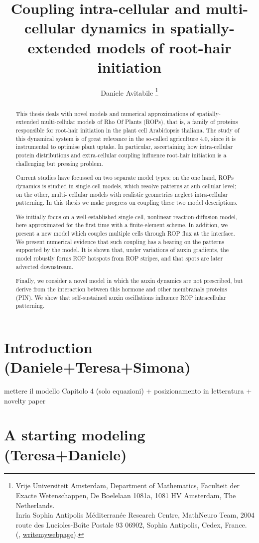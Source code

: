 \documentclass[a4paper]{siamart190516}
\title{Coupling intra-cellular and multi-cellular dynamics in spatially-extended models of root-hair initiation}
\author{%
  Daniele Avitabile%
  \thanks{%
    Vrije Universiteit Amsterdam,
    Department of Mathematics,
    Faculteit der Exacte Wetenschappen,
    De Boelelaan 1081a,
    1081 HV Amsterdam, The Netherlands.
  \protect\\
    Inria Sophia Antipolis M\'editerran\'ee Research Centre,
    MathNeuro Team,
    2004 route des Lucioles-Boîte Postale 93 06902,
    Sophia Antipolis, Cedex, France.
  \protect\\
    (\email{d.avitabile@vu.nl}, \url{writemywebpage}).
  }
}
\begin{document}
\maketitle

\begin{abstract}
This thesis deals with novel models and numerical approximations of spatially-extended multi-cellular models of Rho Of Plants (ROPs), that is, a family of proteins responsible for root-hair initiation in the plant cell Arabidopsis thaliana. The study of this dynamical system is of great relevance in the so-called agriculture 4.0, since it is instrumental to optimise plant uptake. In particular, ascertaining how intra-cellular protein distributions and extra-cellular coupling influence root-hair initiation is a challenging but pressing problem.

Current studies have focussed on two separate model types: on the one hand, ROPs dynamics is studied in single-cell models, which resolve patterns at sub cellular level; on the other, multi- cellular models with realistic geometries neglect intra-cellular patterning. In this thesis we make progress on coupling these two
model descriptions.

We initially focus on a well-established single-cell, nonlinear reaction-diffusion model, here approximated for the first time with a finite-element scheme. In addition, we present a new model which couples multiple cells through ROP flux at the interface. We present numerical evidence that such coupling has a bearing on the patterns supported by the model. It is shown that, under variations of auxin gradients, the model robustly forms ROP hotspots from ROP stripes, and that spots are later advected downstream.

Finally, we consider a novel model in which the auxin dynamics are not prescribed, but derive from the interaction between this hormone and other membranals proteins (PIN). We show that self-sustained auxin oscillations influence ROP intracellular patterning.
\end{abstract}

\section{Introduction (Daniele+Teresa+Simona)}

mettere il modello Capitolo 4 (solo equazioni) +  posizionamento in
letteratura + novelty paper

\section{A starting modeling  (Teresa+Daniele)}
\end{document}
